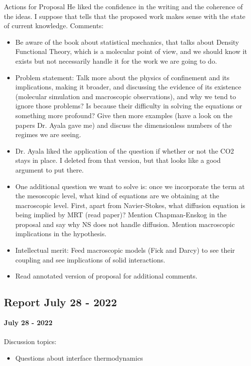 \documentclass[8pt]{beamer}
\begin{document}
	
	\begin{frame}[t]{Actions for Proposal}
		He liked the confidence in the writing and the coherence of the ideas. I suppose that tells that the proposed work makes sense with the state of current knowledge. Comments:
		\begin{itemize}
			\item Be aware of the book about statistical mechanics, that talks about Density Functional Theory, which is a molecular point of view, and we should know it exists but not necessarily handle it for the work we are going to do. 
			\item Problem statement: Talk more about the physics of confinement and its implications, making it broader, and discussing the evidence of its existence (molecular simulation and macroscopic observations), and why we tend to  ignore those problems? Is because their difficulty in solving the equations or something more profound? Give then more examples (have a look on the papers Dr. Ayala gave me) and discuss the dimensionless numbers of the regimes we are seeing. 
			\item Dr. Ayala liked the application of the question if whether or not the CO2 stays in place. I deleted from that version, but that looks like a good argument to put there. 
			\item One additional question we want to solve is: once we incorporate the term at the mesoscopic level, what kind of equations are we obtaining at the macroscopic level. First, apart from Navier-Stokes, what diffusion equation is being implied by MRT (read paper)? Mention Chapman-Enskog in the proposal and say why NS does not handle diffusion. Mention macroscopic implications in the hypothesis.
			\item Intellectual merit: Feed macroscopic models (Fick and Darcy) to see their coupling and see implications of solid interactions.
			\item Read annotated version of proposal for additional comments. 
		\end{itemize}
	\end{frame}
	
	
	\subsection{Report July 28 - 2022}
	\label{}
	\justifying
	\begin{frame}{}
		\textbf{July 28 - 2022}\\~\\
		Discussion topics:
		\begin{itemize}
			\item Questions about interface thermodynamics
		\end{itemize}
	\end{frame}
	
\end{document}
